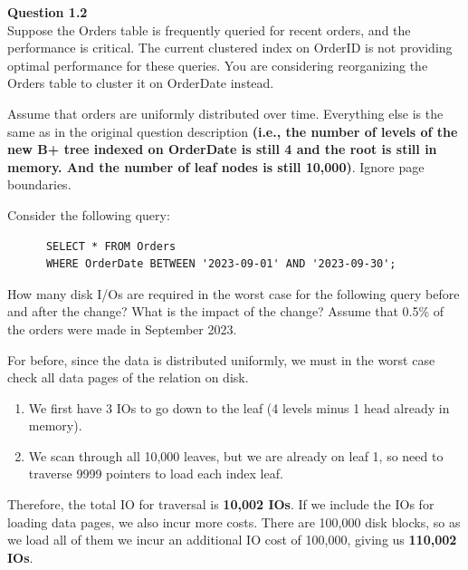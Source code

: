\documentclass{article}
\begin{document}
\begin{example}
      \vspace{1em}
      \noindent\textbf{Question 1.2}\\
      Suppose the Orders table is frequently queried for recent orders, and the performance is critical. The current clustered index on OrderID is not providing optimal performance for these queries. You are considering reorganizing the Orders table to cluster it on OrderDate instead.

      Assume that orders are uniformly distributed over time. Everything else is the same as in the original question description \textbf{(i.e., the number of levels of the new B+ tree indexed on OrderDate is still 4 and the root is still in memory. And the number of leaf nodes is still 10,000)}. Ignore page boundaries.

      Consider the following query:
      \begin{lstlisting}
      SELECT * FROM Orders 
      WHERE OrderDate BETWEEN '2023-09-01' AND '2023-09-30';
      \end{lstlisting}

      How many disk I/Os are required in the worst case for the following query before and after the change? What is the impact of the change? Assume that 0.5\% of the orders were made in September 2023.

      For before, since the data is distributed uniformly, we must in the worst case check all data pages of the relation on disk. 
      \begin{enumerate}
        \item We first have 3 IOs to go down to the leaf (4 levels minus 1 head already in memory). 
        \item We scan through all 10,000 leaves, but we are already on leaf 1, so need to traverse 9999 pointers to load each index leaf. 
      \end{enumerate}
      Therefore, the total IO for traversal is \textbf{10,002 IOs}. If we include the IOs for loading data pages, we also incur more costs. There are 100,000 disk blocks, so as we load all of them we incur an additional IO cost of 100,000, giving us \textbf{110,002 IOs}. 



\end{example}
\end{document}
